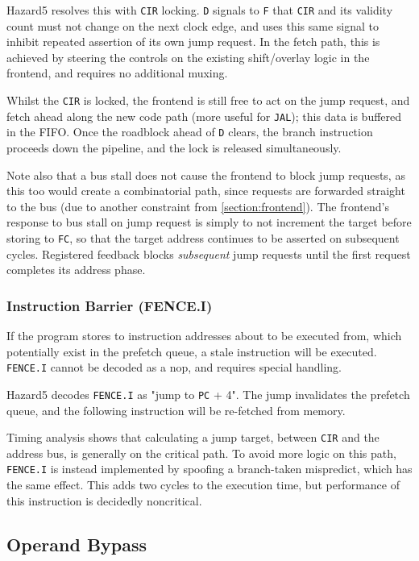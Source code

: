 \documentclass[notitlepage]{article}
\begin{document}
Hazard5 resolves this with {\tt CIR} locking. {\tt D} signals to {\tt F} that {\tt CIR} and its validity count must not change on the next clock edge, and uses this same signal to inhibit repeated assertion of its own jump request. In the fetch path, this is achieved by steering the controls on the existing shift/overlay logic in the frontend, and requires no additional muxing.

Whilst the {\tt CIR} is locked, the frontend is still free to act on the jump request, and fetch ahead along the new code path (more useful for {\tt JAL}); this data is buffered in the FIFO. Once the roadblock ahead of {\tt D} clears, the branch instruction proceeds down the pipeline, and the lock is released simultaneously.

Note also that a bus stall does not cause the frontend to block jump requests, as this too would create a combinatorial path, since requests are forwarded straight to the bus (due to another constraint from \ref{section:frontend}). The frontend's response to bus stall on jump request is simply to not increment the target before storing to {\tt FC}, so that the target address continues to be asserted on subsequent cycles. Registered feedback blocks {\it subsequent} jump requests until the first request completes its address phase.

\subsubsection{Instruction Barrier (FENCE.I)}

If the program stores to instruction addresses about to be executed from, which potentially exist in the prefetch queue, a stale instruction will be executed. {\tt FENCE.I} cannot be decoded as a nop, and requires special handling.

Hazard5 decodes {\tt FENCE.I} as "jump to {\tt PC} + 4". The jump invalidates the prefetch queue, and the following instruction will be re-fetched from memory.

Timing analysis shows that calculating a jump target, between {\tt CIR} and the address bus, is generally on the critical path. To avoid more logic on this path, {\tt FENCE.I} is instead implemented by spoofing a branch-taken mispredict, which has the same effect. This adds two cycles to the execution time, but performance of this instruction is decidedly noncritical.

\subsection{Operand Bypass}
\end{document}
